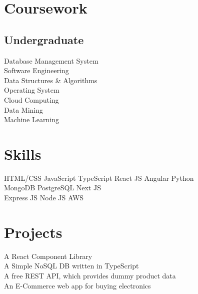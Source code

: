 \documentclass[]{deedy-resume-openfont}
\begin{document}
\begin{minipage}[t]{0.31\textwidth}

\section{Coursework}
\subsection{Undergraduate}
Database Management System \\
Software Engineering \\
Data Structures \& Algorithms \\
Operating System \\
Cloud Computing \\
Data Mining \\
Machine Learning \\
\sectionsep


\section{Skills}
\textbullet{} HTML/CSS \textbullet{}  JavaScript \textbullet{} TypeScript 
 \textbullet{} React JS \textbullet{} Angular \textbullet{} Python\\ \textbullet{} MongoDB \textbullet{} PostgreSQL \textbullet{} Next JS \\ \textbullet{} Express JS \textbullet{} Node JS \textbullet{} AWS
\sectionsep


\section{Projects}
\textbullet{}  
{\normalsize A React Component Library} \\
\textbullet{} 
{\normalsize A Simple NoSQL DB written in TypeScript} \\
\textbullet{} 
{\normalsize A free REST API, which provides dummy product data} \\
\textbullet{} 
{\normalsize An E-Commerce web app for buying electronics} \\
\sectionsep

%
%

\end{minipage} 
\end{document}

